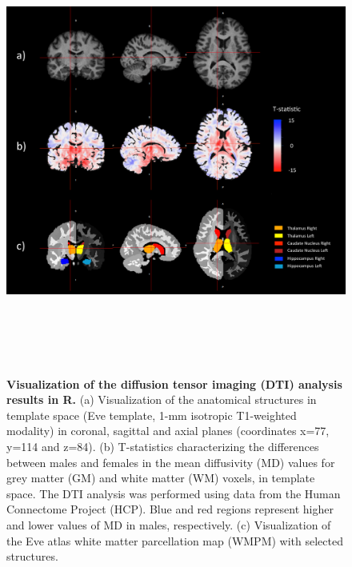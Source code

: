 \documentclass[]{elsarticle} %
\begin{document}
\begin{figure}[!ht]
  \begin{center}
    \caption{\textbf{Visualization of the diffusion tensor imaging (DTI) analysis results in R.} (a) Visualization of the anatomical structures in template space (Eve template, 1-mm isotropic T1-weighted modality) in coronal, sagittal and axial planes (coordinates x=77, y=114 and z=84). (b) T-statistics characterizing the differences between males and females in the mean diffusivity (MD) values for grey matter (GM) and white matter (WM) voxels, in template space. The DTI analysis was performed using data from the Human Connectome Project (HCP). Blue and red regions represent higher and lower values of MD in males, respectively. (c) Visualization of the Eve atlas white matter parcellation map (WMPM) with selected structures.} 
    \includegraphics[height=5.5in]{figures/figure_dti.pdf}
    \label{fig:dti}
  \end{center}
\end{figure}

\end{document}
